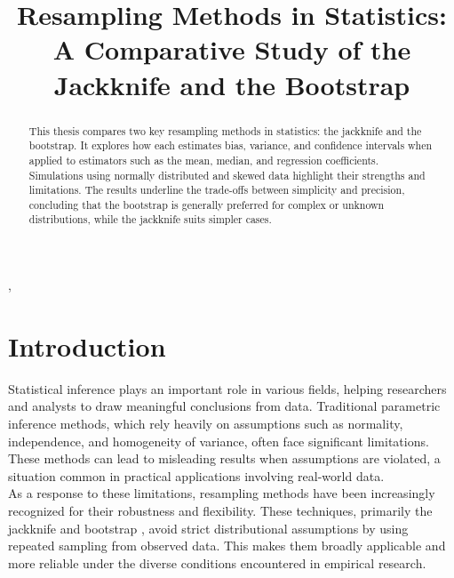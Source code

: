 \documentclass[aodsor,preprint]{imsart}
\numberwithin{equation}{section}
\theoremstyle{plain}
\begin{document}
\begin{frontmatter}
\title{Resampling Methods in Statistics: A Comparative Study of the
Jackknife and the Bootstrap}

\begin{aug}
\author{ },




\end{aug}


\begin{abstract}
This thesis compares two key resampling methods in statistics: the jackknife and the bootstrap. It explores how each estimates bias, variance, and confidence intervals when applied to estimators such as the mean, median, and regression coefficients. Simulations using normally distributed and skewed data highlight their strengths and limitations.  The results underline the trade-offs between simplicity and precision, concluding that the bootstrap is generally preferred for complex or unknown distributions, while the jackknife suits simpler cases.
\end{abstract}


\end{frontmatter}

\section{Introduction}

Statistical inference plays an important role in various fields, helping researchers and analysts to draw meaningful conclusions from data. Traditional parametric inference methods, which rely heavily on assumptions such as normality, independence, and homogeneity of variance, often face significant limitations. \cite{efron1993introduction} These methods can lead to misleading results when assumptions are violated, a situation common in practical applications involving real-world data.   \\ 

As a response to these limitations, resampling methods have been increasingly recognized for their robustness and flexibility. These techniques, primarily the jackknife \cite{tukey1958bias} and bootstrap \cite{efron1982jackknife}, avoid strict distributional assumptions by using repeated sampling from observed data. This makes them broadly applicable and more reliable under the diverse conditions encountered in empirical research. \\
\end{document}
